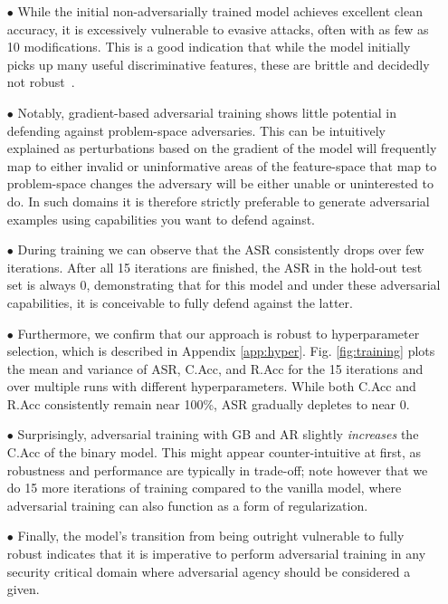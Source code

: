 \begin{itemize}
    \item[$\bullet$] While the initial non-adversarially trained model achieves excellent clean accuracy, it is excessively vulnerable to evasive attacks, often with as few as 10 modifications. This is a good indication that while the model initially picks up many useful discriminative features, these are brittle and decidedly not robust~\cite{ilyas2019adversarial}.
    \item[$\bullet$] Notably, gradient-based adversarial training shows little potential in defending against problem-space adversaries. This can be intuitively explained as perturbations based on the gradient of the model will frequently map to either invalid or uninformative areas of the feature-space that map to problem-space changes the adversary will be either unable or uninterested to do. In such domains it is therefore strictly preferable to generate adversarial examples using capabilities you want to defend against.
    \item[$\bullet$] During training we can observe that the ASR consistently drops over few iterations. After all 15 iterations are finished, the ASR in the hold-out test set is always 0, demonstrating that for this model and under these adversarial capabilities, it is conceivable to fully defend against the latter. 
    \item[$\bullet$] Furthermore, we confirm that our approach is robust to hyperparameter selection, which is described in Appendix \ref{app:hyper}. Fig. \ref{fig:training} plots the mean and variance of ASR, C.Acc, and R.Acc for the 15 iterations and over multiple runs with different hyperparameters. While both C.Acc and R.Acc consistently remain near 100\%, ASR gradually depletes to near 0.
    \item[$\bullet$] Surprisingly, adversarial training with GB and AR slightly \textit{increases} the C.Acc of the binary model. This might appear counter-intuitive at first, as robustness and performance are typically in trade-off; note however that we do 15 more iterations of training compared to the vanilla model, where adversarial training can also function as a form of regularization.
    \item[$\bullet$] Finally, the model's transition from being outright vulnerable to fully robust indicates that it is imperative to perform adversarial training in any security critical domain where adversarial agency should be considered a given.
\end{itemize}

